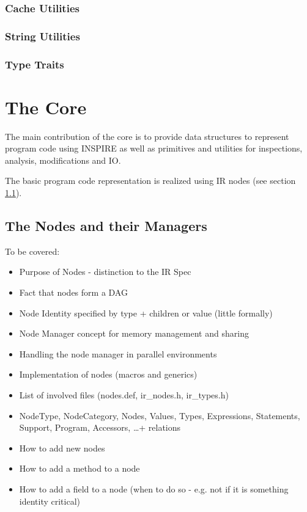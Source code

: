 \subsubsection{Cache Utilities}
\subsubsection{String Utilities}
\subsubsection{Type Traits}

\section{The Core}
The main contribution of the core is to provide data structures to represent
program code using INSPIRE as well as primitives and utilities for inspections,
analysis, modifications and IO.

The basic program code representation is realized using IR nodes (see section
\ref{sec:Compiler.Core.NodesAndManagers}). 



\subsection{The Nodes and their Managers}
\label{sec:Compiler.Core.NodesAndManagers}

To be covered:
\begin{itemize}
  \item Purpose of Nodes - distinction to the IR Spec
  \item Fact that nodes form a DAG
  \item Node Identity specified by type + children or value (little formally)
  \item Node Manager concept for memory management and sharing
  \item Handling the node manager in parallel environments
  \item Implementation of nodes (macros and generics)
  \item List of involved files (nodes.def, ir\_nodes.h, ir\_types.h)
  \item NodeType, NodeCategory, Nodes, Values, Types, Expressions, Statements,
  Support, Program, Accessors, \ldots + relations
  \item How to add new nodes
  \item How to add a method to a node
  \item How to add a field to a node (when to do so - e.g. not if it is
  something identity critical)
\end{itemize}


